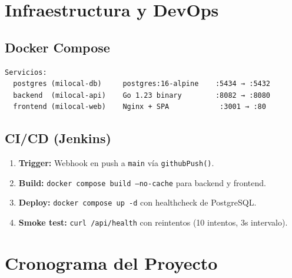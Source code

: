 \documentclass[11pt,a4paper]{article}
\begin{document}
\section{Infraestructura y DevOps}

\subsection{Docker Compose}

\begin{verbatim}
Servicios:
  postgres (milocal-db)     postgres:16-alpine    :5434 → :5432
  backend  (milocal-api)    Go 1.23 binary        :8082 → :8080
  frontend (milocal-web)    Nginx + SPA            :3001 → :80
\end{verbatim}

\subsection{CI/CD (Jenkins)}

\begin{enumerate}
    \item \textbf{Trigger:} Webhook en push a \texttt{main} vía \texttt{githubPush()}.
    \item \textbf{Build:} \texttt{docker compose build --no-cache} para backend y frontend.
    \item \textbf{Deploy:} \texttt{docker compose up -d} con healthcheck de PostgreSQL.
    \item \textbf{Smoke test:} \texttt{curl /api/health} con reintentos (10 intentos, 3s intervalo).
\end{enumerate}

\section{Cronograma del Proyecto}
\end{document}
